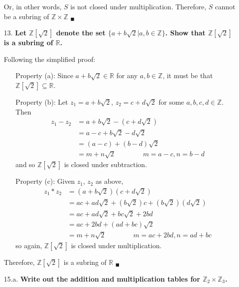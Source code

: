 \documentclass{article}
\begin{document}
\begin{enumerate}
			Or, in other words, $S$ is not closed under multiplication. Therefore, $S$ cannot be a 
			subring of $\mathbb{Z} \times \mathbb{Z}$ $_{\blacksquare}$

		\item [13.] \textbf{Let $\mathbb{Z}[\sqrt{2}]$ denote the set $\lbrace a + b\sqrt{2} | a, b 
						\in \mathbb{Z} \rbrace$. Show that $\mathbb{Z}[\sqrt{2}]$ is a subring of 
						$\mathbb{R}$.}

			Following the simplified proof:
			\begin{enumerate}
				\item [Property (a):] Since $a + b\sqrt{2} \in \mathbb{R}$ for any $a, b \in 
					\mathbb{Z}$, it must be that $\mathbb{Z}[\sqrt{2}] \subseteq \mathbb{R}$.
				\item [Property (b):] Let $z_1 = a + b\sqrt{2}$, $z_2 = c + d\sqrt{2}$ for some 
					$a, b, c, d \in \mathbb{Z}$. Then 
					\begin{align*}
						z_1 - z_2 & = a + b\sqrt{2} - (c + d\sqrt{2}) \\
								  & = a - c + b\sqrt{2} - d\sqrt{2} \\
								  & = (a - c) + (b - d)\sqrt{2} \\
								  & = m + n\sqrt{2} \qquad \qquad m = a - c, n = b - d
					\end{align*}
					and so $\mathbb{Z}[\sqrt{2}]$ is closed under subtraction.
				\item [Property (c):] Given $z_1$, $z_2$ as above,
					\begin{align*}
						z_1 * z_2 & = (a + b\sqrt{2})(c + d\sqrt{2}) \\
								  & = ac + ad\sqrt{2} + (b\sqrt{2})c + (b\sqrt{2})(d\sqrt{2}) \\
								  & = ac + ad\sqrt{2} + bc\sqrt{2} + 2bd \\
								  & = ac + 2bd + (ad + bc)\sqrt{2} \\
								  & = m + n\sqrt{2} \qquad \qquad m = ac + 2bd, n = ad + bc
					\end{align*}
					so again, $\mathbb{Z}[\sqrt{2}]$ is closed under multiplication.
			\end{enumerate}

			Therefore, $\mathbb{Z}[\sqrt{2}]$ is a subring of $\mathbb{R}$ $_{\blacksquare}$

		\pagebreak
		\item [15.a.] \textbf{Write out the addition and multiplication tables for $\mathbb{Z}_2 
						\times \mathbb{Z}_3$.}


\end{enumerate}
\end{document}
